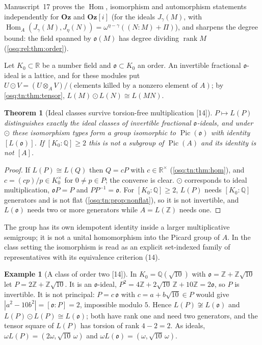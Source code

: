 \documentclass[11pt,letterpaper]{article}
\numberwithin{equation}{section}
\newtheorem{theorem}{Theorem}[section]
\theoremstyle{definition}
\newtheorem{example}[example]{Example}
\theoremstyle{remark}
\theoremstyle{plain}
\newcommand{\Oz}{\mathbf{Oz}}
\newcommand{\GOz}{\Oz[i]}
\newcommand{\Z}{\mathbb Z}
\newcommand{\Q}{\mathbb Q}
\newcommand{\R}{\mathbb R}
\newcommand{\Hom}{\operatorname{Hom}}
\newcommand{\rk}{\operatorname{rank}}
\newcommand{\src}[1]{\textup{\textsf{[#1]}}}
\begin{document}
Manuscript~17 proves the $\Hom$, isomorphism and automorphism statements independently for $\Oz$ and $\GOz$ (for the ideals
$J_\gamma(M)$, with $\Hom_A(J_\gamma(M),J_\eta(N))=\omega^{\eta-\gamma}((N:M)+\Pi)$), and sharpens the degree bound: the field spanned
by $\mathfrak o(M)$ has degree dividing $\rk M$ (\cref{osq:rel:thm:order}).

Let $K_0\subset\R$ be a number field and $\mathfrak o\subset K_0$ an order. An invertible fractional $\mathfrak o$-ideal is a lattice, and
for these modules put $U\odot V=(U\otimes_AV)/(\text{elements killed by a nonzero element of }A)$; by \cref{osq:tn:thm:tensor},
$L(M)\odot L(N)\cong L(MN)$.

\begin{theorem}[Ideal classes survive torsion-free multiplication \src{14}]\label{osq:tn:thm:pic}
$P\mapsto L(P)$ distinguishes exactly the ideal classes of invertible fractional $\mathfrak o$-ideals, and under $\odot$ these isomorphism
types form a group isomorphic to $\operatorname{Pic}(\mathfrak o)$ with identity $[L(\mathfrak o)]$. If $[K_0:\Q]\ge2$ this is not a subgroup of
$\operatorname{Pic}(A)$ and its identity is not $[A]$.
\end{theorem}
\begin{proof}
If $L(P)\cong L(Q)$ then $Q=cP$ with $c\in\R^\times$ (\cref{osq:tn:thm:hom}), and $c=(cp)/p\in K_0^\times$ for $0\ne p\in P$; the converse is
clear. $\odot$ corresponds to ideal multiplication, $\mathfrak oP=P$ and $PP^{-1}=\mathfrak o$. For $[K_0:\Q]\ge2$, $L(P)$ needs $[K_0:\Q]$
generators and is not flat (\cref{osq:tn:prop:nonflat}), so it is not invertible, and $L(\mathfrak o)$ needs two or more generators while
$A=L(\Z)$ needs one.
\end{proof}

The group has its own idempotent identity inside a larger multiplicative semigroup; it is not a unital homomorphism into the Picard
group of $A$. In the class setting the isomorphism is read as an explicit set-indexed family of representatives with its equivalence
criterion (14).

\begin{example}[A class of order two \src{14}]\label{osq:tn:ex:sqrt10}
In $K_0=\Q(\sqrt{10})$ with $\mathfrak o=\Z+\Z\sqrt{10}$ let $P=2\Z+\Z\sqrt{10}$. It is an $\mathfrak o$-ideal, $P^2=4\Z+2\sqrt{10}\,\Z+10\Z=2\mathfrak o$,
so $P$ is invertible. It is not principal: $P=c\,\mathfrak o$ with $c=a+b\sqrt{10}\in P$ would give $|a^2-10b^2|=[\mathfrak o:P]=2$, impossible
modulo $5$. Hence $L(P)\not\cong L(\mathfrak o)$ and $L(P)\odot L(P)\cong L(\mathfrak o)$; both have rank one and need two generators, and the
tensor square of $L(P)$ has torsion of rank $4-2=2$. As ideals, $\omega L(P)=(2\omega,\sqrt{10}\,\omega)$ and
$\omega L(\mathfrak o)=(\omega,\sqrt{10}\,\omega)$.
\end{example}
\end{document}
